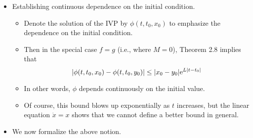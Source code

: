 \documentclass[../notes.tex]{subfiles}
\begin{document}
\begin{itemize}
\begin{align*}
        x(t_0) &= x_0&
            y(t_0) &= y_0
    \end{align*}
    then
    \begin{equation*}
        |x(t)-y(t)| \leq |x_0-y_0|\e[L|t-t_0|]+\frac{M}{L}(\e[L|t-t_0|]-1)
    \end{equation*}
    where $L$ is the Lipschitz constant of $f:V\to\R^n$, $M=\norm{f-g}$ for $f,g:V\to\R^n$, and $V\subset U$ contains $G(x),G(y)$.
    \begin{proof}
        WLOG let $t_0=0$. Then
        \begin{align*}
            |x(t)-y(t)| &\leq |x_0-y_0|+\int_0^t|f(s,x(s))-g(s,y(s))|\dd{s}\\
            &\leq |x_0-y_0|+\int_0^t(L|x(s)-y(s)|+M)\dd{s}
        \end{align*}
        Thus, taking
        \begin{equation*}
            \underbrace{|x(t)-y(t)|}_{\psi(t)} \leq \underbrace{|x_0-y_0|}_\alpha+\int_0^t(\underbrace{\vphantom{|}L}_\beta\underbrace{|x(s)-y(s)|}_{\phi(s)}+\underbrace{\vphantom{|}M}_\gamma)\dd{s}
        \end{equation*}
        we have by the above consequence of the generalized Gr\"{o}nwall's inequality that
        \begin{equation*}
            |x(t)-y(t)| \leq |x_0-y_0|\e[Lt]+\frac{M}{L}(\e[Lt]-1)
        \end{equation*}
        as desired.
    \end{proof}
    \item Establishing continuous dependence on the initial condition.
    \begin{itemize}
        \item Denote the solution of the IVP by $\phi(t,t_0,x_0)$ to emphasize the dependence on the initial condition.
        \item Then in the special case $f=g$ (i.e., where $M=0$), Theorem 2.8 implies that
        \begin{equation*}
            |\phi(t,t_0,x_0)-\phi(t,t_0,y_0)| \leq |x_0-y_0|\e[L|t-t_0|]
        \end{equation*}
        \item In other words, $\phi$ depends continuously on the initial value.
        \item Of course, this bound blows up exponentially as $t$ increases, but the linear equation $\dot{x}=x$ shows that we cannot define a better bound in general.
    \end{itemize}
    \item We now formalize the above notion.

\end{itemize}
\end{document}
